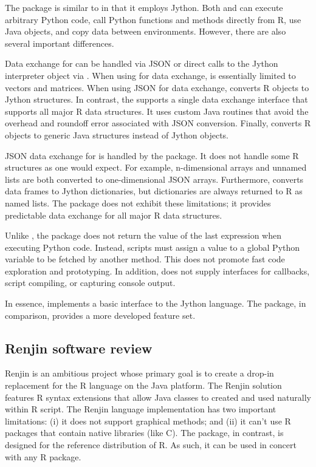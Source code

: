 The  package is similar to  in that it employs Jython. Both  and  can execute arbitrary Python code, call Python functions and methods directly from R, use Java objects, and copy data between environments. However, there are also several important differences.

Data exchange for  can be handled via JSON or direct calls to the Jython interpreter object via . When using  for data exchange,  is essentially limited to vectors and matrices. When using JSON for data exchange,  converts R objects to Jython structures. In contrast, the  supports a single data exchange interface that supports all major R data structures. It uses custom Java routines that avoid the overhead and roundoff error associated with JSON conversion. Finally,  converts R objects to generic Java structures instead of Jython objects.

JSON data exchange for  is handled by the  \citep{rjson} package. It does not handle some R structures as one would expect. For example, n-dimensional arrays and unnamed lists are both converted to one-dimensional JSON arrays. Furthermore,  converts data frames to Jython dictionaries, but dictionaries are always returned to R as named lists. The  package does not exhibit these limitations; it provides predictable data exchange for all major R data structures.

Unlike , the  package does not return the value of the last expression when executing Python code. Instead, scripts must assign a value to a global Python variable to be fetched by another  method. This does not promote fast code exploration and prototyping. In addition,  does not supply interfaces for callbacks, script compiling, or capturing console output.

In essence,  implements a basic interface to the Jython language. The  package, in comparison, provides a more developed feature set.

\subsection{Renjin software review}

Renjin \citep{renjin} is an ambitious project whose primary goal is to create a drop-in replacement for the R language on the Java platform. The Renjin solution features R syntax extensions that allow Java classes to created and used naturally within R script. The Renjin language implementation has two important limitations: (i) it does not support graphical methods; and (ii) it can't use R packages that contain native libraries (like C). The  package, in contrast, is designed for the reference distribution of R. As such, it can be used in concert with any R package.

